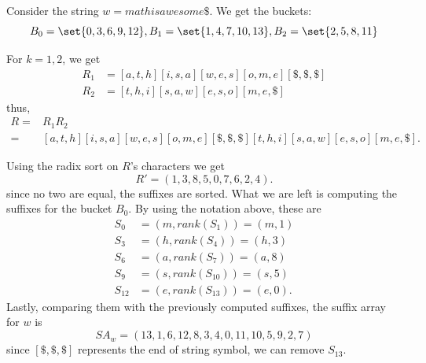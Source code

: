 \documentclass{subfiles}
\begin{document}
    \begin{example*}%
        Consider the string \(w = m a t h i s a w e s  o  m  e  \$\). We get the buckets:
        \[
            B_{0} = \set{0, 3, 6, 9, 12},
            B_{1} = \set{1, 4, 7, 10, 13}, 
            B_{2} = \set{2, 5, 8, 11}
        \]

        For \(k = 1, 2\), we get 
            \[\begin{aligned}
                R_{1} & = [a,t,h][i,s,a][w,e,s][o,m,e][\$,\$,\$] \\
                R_{2} & = [t,h,i][s,a,w][e,s,o][m,e,\$]
            \end{aligned}\]
            thus, 
            \[\begin{aligned}
                R = & R_{1}R_{2} \\
                  = & [a,t,h][i,s,a][w,e,s][o,m,e][\$,\$,\$][t,h,i][s,a,w][e,s,o][m,e,\$].
            \end{aligned}\]

        Using the radix sort on \(R\)'s characters we get
            \[
               R' = (1, 3, 8, 5, 0, 7, 6, 2, 4).
            \]
            since no two are equal, the suffixes are sorted. 
            What we are left is computing the suffixes for the bucket \(B_{0}\).
            By using the notation above, these are 
            \[\begin{aligned}
                S_{0} & = (m, rank(S_{1})) = (m, 1) \\ 
                S_{3} & = (h, rank(S_{4})) = (h, 3) \\ 
                S_{6} & = (a, rank(S_{7})) = (a, 8) \\ 
                S_{9} & = (s, rank(S_{10})) = (s, 5) \\ 
                S_{12} & = (e, rank(S_{13})) = (e, 0).
            \end{aligned}\]
            Lastly, comparing them with the previously computed suffixes, 
            the suffix array for \(w\) is 
            \[
                SA_{w} = (13, 1, 6, 12, 8, 3, 4, 0, 11, 10, 5, 9, 2, 7)
            \]
            since \([\$,\$,\$]\) represents the end of string symbol, 
            we can remove \(S_{13}\). 
    \end{example*}
\end{document}
